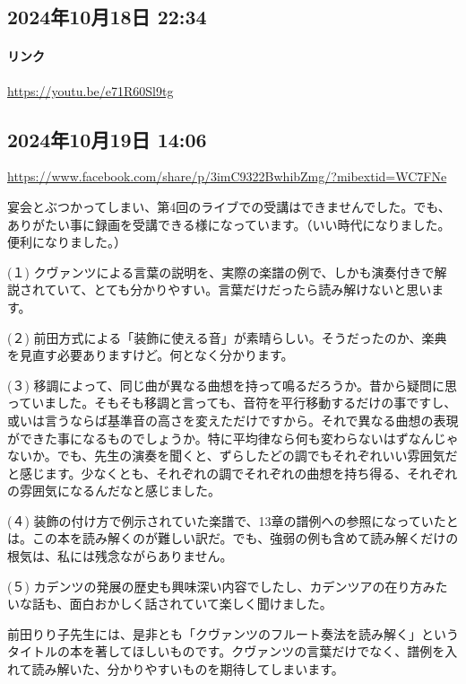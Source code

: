 \subsection*{2024年10月18日 22:34}

\paragraph{リンク}
\url{https://youtu.be/e71R60Sl9tg}

\subsection*{2024年10月19日 14:06}

\url{https://www.facebook.com/share/p/3imC9322BwhibZmg/?mibextid=WC7FNe}

宴会とぶつかってしまい、第4回のライブでの受講はできませんでした。でも、ありがたい事に録画を受講できる様になっています。（いい時代になりました。便利になりました。）

(１) クヴァンツによる言葉の説明を、実際の楽譜の例で、しかも演奏付きで解説されていて、とても分かりやすい。言葉だけだったら読み解けないと思います。

(２) 前田方式による「装飾に使える音」が素晴らしい。そうだったのか、楽典を見直す必要ありますけど。何となく分かります。

(３) 移調によって、同じ曲が異なる曲想を持って鳴るだろうか。昔から疑問に思っていました。そもそも移調と言っても、音符を平行移動するだけの事ですし、或いは言うならば基準音の高さを変えただけですから。それで異なる曲想の表現ができた事になるものでしょうか。特に平均律なら何も変わらないはずなんじゃないか。でも、先生の演奏を聞くと、ずらしたどの調でもそれぞれいい雰囲気だと感じます。少なくとも、それぞれの調でそれぞれの曲想を持ち得る、それぞれの雰囲気になるんだなと感じました。

(４) 装飾の付け方で例示されていた楽譜で、13章の譜例への参照になっていたとは。この本を読み解くのが難しい訳だ。でも、強弱の例も含めて読み解くだけの根気は、私には残念ながらありません。

(５) カデンツの発展の歴史も興味深い内容でしたし、カデンツアの在り方みたいな話も、面白おかしく話されていて楽しく聞けました。

前田りり子先生には、是非とも「クヴァンツのフルート奏法を読み解く」というタイトルの本を著してほしいものです。クヴァンツの言葉だけでなく、譜例を入れて読み解いた、分かりやすいものを期待してしまいます。


